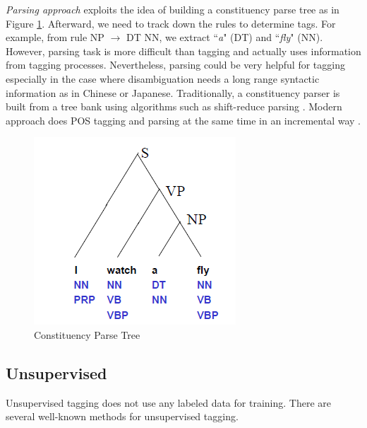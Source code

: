 \textit{Parsing approach} exploits the idea of building a constituency parse tree as in Figure \ref{fig:parsingTagging}. Afterward, we need to track down the rules to determine tags. For example, from rule NP $\rightarrow$ DT NN, we extract ``\textit{a}" (DT) and ``\textit{fly}" (NN). However, parsing task is more difficult than tagging and actually uses information from tagging processes. Nevertheless, parsing could be very helpful for tagging especially in the case where disambiguation needs a long range syntactic information as in Chinese or Japanese. Traditionally, a constituency parser is built from a tree bank using algorithms such as shift-reduce parsing \cite{shiftReduce}. Modern approach does POS tagging and parsing at the same time in an incremental way \cite{ParsingAndTagging}. 
\begin{figure}
\centering
\includegraphics[scale=0.8]{Figures/Constituency_parsing}
\caption{Constituency Parse Tree}
\label{fig:parsingTagging}
\end{figure}

\subsection{Unsupervised}
Unsupervised tagging does not use any labeled data for training. There are several well-known methods for unsupervised tagging.  
